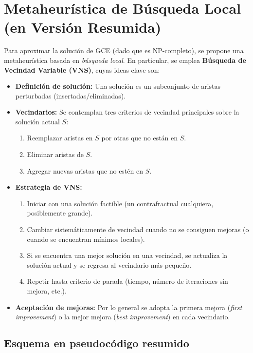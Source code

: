 \documentclass[a4paper]{article}
\begin{document}
\section{Metaheurística de Búsqueda Local (en Versión Resumida)}

Para aproximar la solución de GCE (dado que es NP-completo), se propone una metaheurística basada en \emph{búsqueda local}.  
En particular, se emplea \textbf{Búsqueda de Vecindad Variable (VNS)}, cuyas ideas clave son:

\begin{itemize}
    \item \textbf{Definición de solución:} 
    Una solución es un subconjunto de aristas perturbadas (insertadas/eliminadas).
    \item \textbf{Vecindarios:} 
    Se contemplan tres criterios de vecindad principales sobre la solución actual $S$:
    \begin{enumerate}
        \item Reemplazar aristas en $S$ por otras que no están en $S$. 
        \item Eliminar aristas de $S$. 
        \item Agregar nuevas aristas que no estén en $S$. 
    \end{enumerate}
    \item \textbf{Estrategia de VNS:} 
    \begin{enumerate}
        \item Iniciar con una solución factible (un contrafractual cualquiera, posiblemente grande).  
        \item Cambiar sistemáticamente de vecindad cuando no se consiguen mejoras (o cuando se encuentran mínimos locales).  
        \item Si se encuentra una mejor solución en una vecindad, se actualiza la solución actual y se regresa al vecindario más pequeño.  
        \item Repetir hasta criterio de parada (tiempo, número de iteraciones sin mejora, etc.). 
    \end{enumerate}
    \item \textbf{Aceptación de mejoras:} 
    Por lo general se adopta la primera mejora (\emph{first improvement}) o la mejor mejora (\emph{best improvement}) en cada vecindario.
\end{itemize}

\subsection*{Esquema en pseudocódigo resumido}
\end{document}
